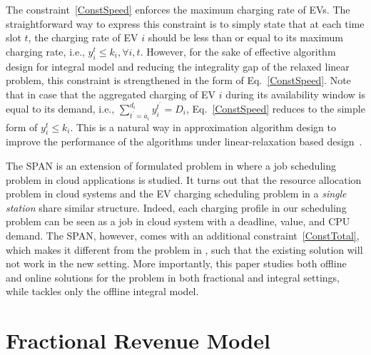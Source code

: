 \documentclass[journal]{IEEEtran}
\newcommand{\revv}[1]{{\color{black}#1}}%
\newcommand{\MCSP}{\textsf{SPAN}\xspace}
\begin{document}
		\revv{The constraint~\eqref{ConstSpeed} enforces the maximum charging rate of EVs. The straightforward way to express this constraint is to simply state that at each time slot $t$, the charging rate of EV $i$ should be less than or equal to its maximum charging rate, i.e., $y_i^t\leq k_i, \forall i,t$. 
		However, for the sake of effective algorithm design for integral model and reducing the integrality gap of the relaxed linear problem, this constraint is strengthened in the form of Eq.~\eqref{ConstSpeed}. 
		Note that in case that the aggregated charging of EV $i$ during its availability window is equal to its demand, i.e., $\sum_{t^\prime=a_i}^{d_i} y_i^{t^\prime}= D_i$, Eq.~\eqref{ConstSpeed} reduces to the simple form of $y_i^t\leq k_i$.  
		This is a natural way in approximation algorithm design to improve the performance of the algorithms under linear-relaxation based design~\cite{Carr}. } 
	
	
The \MCSP is an extension of formulated problem in \cite{Jain} where a job scheduling problem in cloud applications is studied. It turns out that the resource allocation problem in cloud systems and the EV charging scheduling problem in a \emph{single station} share similar structure. Indeed, each charging profile in our scheduling problem can be seen as a job in cloud system with a deadline, value, and CPU demand. The \MCSP, however, comes with an additional constraint~\eqref{ConstTotal}, which makes it different from the problem in \cite{Jain}, such that the existing solution \revv{will not} work in the new setting. More importantly, this paper studies both offline and online solutions for the problem in both fractional and integral settings, while \cite{Jain} tackles only the offline integral model.  
		



		
		\section{Fractional Revenue Model}
		\label{sec:fractional}
\end{document}

